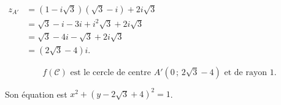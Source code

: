 \documentclass[12pt,a4paper]{article}
\begin{document}
\begin{enumerate}
\begin{enumerate}
    $
    \begin{aligned}
    z_{A'} &= \left(1 - i\sqrt3\right)\left(\sqrt3 - i\right) + 2i\sqrt3 \\[1mm]
           &= \sqrt3 - i - 3i + i^2\sqrt3 + 2i\sqrt3 \\[1mm]
           &= \sqrt3 - 4i - \sqrt3 + 2i\sqrt3 \\[1mm]
           &= \left(2\sqrt3 - 4\right)i.
    \end{aligned}
    $

    \[
    \boxed{f(\mathscr{C}) \text{ est le cercle de centre } A'\left(0\,;\,2\sqrt3 - 4\right) \text{ et de rayon } 1.}
    \]

    Son équation est $x^2 + \left(y - 2\sqrt3 + 4\right)^2 = 1$.

\end{enumerate}

\end{enumerate}
\end{document}
